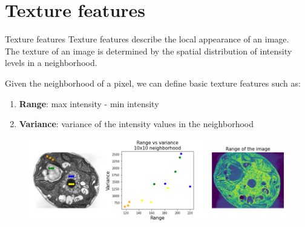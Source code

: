 \documentclass[9pt, aspectratio=169]{beamer}
\begin{document}
\section{Texture features}

\begin{frame}
    {Texture features}
    Texture features describe the local appearance of an image.\\

    The texture of an image is determined by the spatial distribution of intensity levels in a neighborhood.

    Given the neighborhood of a pixel, we can define basic texture features such as:

    \begin{enumerate}
        \item \textbf{Range}: max intensity - min intensity
        \item \textbf{Variance}: variance of the intensity values in the neighborhood
    \end{enumerate}
    \pause

    \centering
    \begin{figure}
        \includegraphics[width=.8\textwidth]{texture_features_range_var.png}
        \caption{\small{\color{gray}{TEM image of a Chlamydomonas green algae - CC0, Dartmouth College}\color{black}}}
    \end{figure}
\end{frame}
\end{document}
